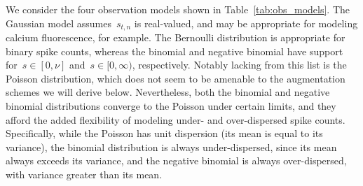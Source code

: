 We consider the four observation models shown in Table~\ref{tab:obs_models}.
The Gaussian model assumes~$s_{t,n}$ is real-valued, and may be
appropriate for modeling calcium fluorescence, for example.
The Bernoulli distribution is appropriate for binary spike counts,
whereas the binomial and negative binomial have support
for~$s\in[0,\nu]$ and~$s \in [0, \infty)$, respectively.
Notably lacking from this list is the Poisson distribution,
which does not seem to be amenable to the augmentation schemes
we will derive below. Nevertheless, both the binomial and negative
binomial distributions converge to the Poisson under certain
limits, and they afford the added flexibility of modeling under- and
over-dispersed spike counts. Specifically, while the Poisson has unit 
dispersion (its mean is equal to its variance), the binomial distribution 
is always under-dispersed, since its mean always exceeds its variance, 
and the negative binomial is always over-dispersed, with variance greater 
than its mean.

